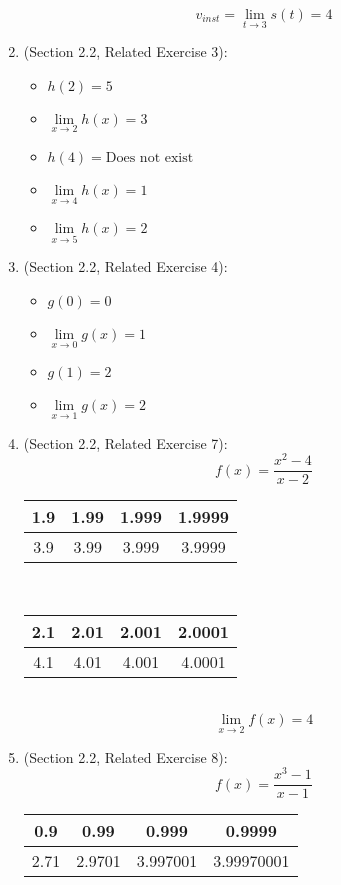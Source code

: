 \documentclass{article}
\begin{document}
\begin{enumerate}
	    $$v_{inst} = \lim_{t \to 3}{s(t)} = 4$$
    \item (Section 2.2, Related Exercise 3):
        \begin{itemize}
		    \item $h(2) = 5$
		    \item $\lim\limits_{x \to 2}{h(x)} = 3$
		    \item $h(4) = \text{Does not exist}$
		    \item $\lim\limits_{x \to 4}{h(x)} = 1$
		    \item $\lim\limits_{x \to 5}{h(x)} = 2$
        \end{itemize}
    \item (Section 2.2, Related Exercise 4):
        \begin{itemize}
		    \item $g(0) = 0$
		    \item $\lim\limits_{x \to 0}{g(x)} = 1$
		    \item $g(1) = 2$
		    \item $\lim\limits_{x \to 1}{g(x)} = 2$
        \end{itemize}
    \item (Section 2.2, Related Exercise 7):
	    $$f(x) = \frac{x^2 - 4}{x - 2}$$
    
	    \begin{tabular}{| c | c | c | c |}
            \hline
	        1.9 & 1.99 & 1.999 & 1.9999 \\
            \hline
	        3.9 & 3.99 & 3.999 & 3.9999 \\
            \hline
        \end{tabular} \\
    
	    \begin{tabular}{| c | c | c | c |}
            \hline
	        2.1 & 2.01 & 2.001 & 2.0001 \\
            \hline
	        4.1 & 4.01 & 4.001 & 4.0001 \\
            \hline
        \end{tabular} \\
    
	    $$\lim_{x \to 2}{f(x)} = 4$$
    \item (Section 2.2, Related Exercise 8):
	    $$f(x) = \frac{x^3 - 1}{x - 1}$$
    
	    \begin{tabular}{| c | c | c | c |}
            \hline
	        0.9 & 0.99 & 0.999 & 0.9999 \\
            \hline
	        2.71 & 2.9701 & 3.997001 & 3.99970001 \\
            \hline
        \end{tabular} \\
    

\end{enumerate}
\end{document}
